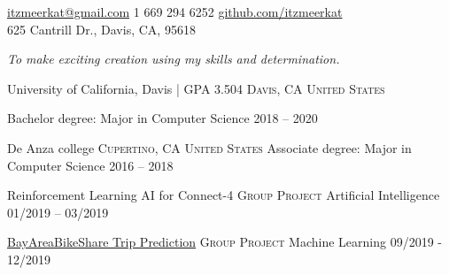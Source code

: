 \documentclass[10pt,a4paper]{article}
\begin{document}
\sloppy
{}

\nobreakvspace{0.3em}
\noindent\href{mailto:itzmeerkat@gmail.com}
{itzmeerkat\mbox{}@\mbox{}gmail.com}
\sbull
\textsmaller{+}1 669 294 6252
\sbull
\href{https://github.com/itzmeerkat}{github.com/itzmeerkat}\\625 Cantrill Dr., Davis, CA, 95618
\spacedhrule{0.9em}{-0.4em}


\noindent \emph{To make exciting creation using my skills and determination.}

\spacedhrule{0.9em}{-0.4em}

\headedsection
{University of California, Davis | GPA 3.504  }
{\textsc{Davis, CA United States}} {
	
	\headedsubsection
	{Bachelor degree: Major in Computer Science}
	{2018 -- 2020}
	{
  }
}

\headedsection
{De Anza college}
{\textsc{Cupertino, CA United States}} {
	\headedsubsection
	{Associate degree: Major in Computer Science}
	{2016 -- 2018}
	{
	}
}
\spacedhrule{0.9em}{-0.4em}


\headedsection
  {Reinforcement Learning AI for Connect-4}
  {\textsc{Group Project}} {
  \headedsubsection
    {Artificial Intelligence}
    {01/2019 – 03/2019}
    {}
}
\vspace{0.4em}

\headedsection
  {\href{https://github.com/itzMeerkat/UCDavis-ECS171-2019Fall-Project}{BayAreaBikeShare Trip Prediction}}
  {\textsc{Group Project}} {%
  \headedsubsection
    {Machine Learning}
    {09/2019 - 12/2019}
    {}}
\end{document}
